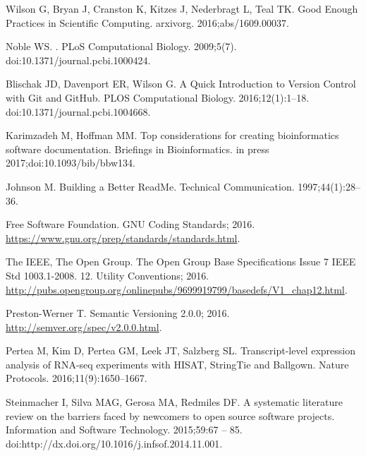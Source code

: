 \documentclass[10pt,letterpaper]{article}
\begin{document}
\begin{thebibliography}{10}
Wilson G, Bryan J, Cranston K, Kitzes J, Nederbragt L, Teal TK.
\newblock Good Enough Practices in Scientific Computing.
\newblock arxivorg. 2016;abs/1609.00037.

Noble WS.
.
\newblock PLoS Computational Biology. 2009;5(7).
\newblock doi:{10.1371/journal.pcbi.1000424}.

Blischak JD, Davenport ER, Wilson G.
\newblock A Quick Introduction to Version Control with Git and GitHub.
\newblock PLOS Computational Biology. 2016;12(1):1--18.
\newblock doi:{10.1371/journal.pcbi.1004668}.

Karimzadeh M, Hoffman MM.
\newblock Top considerations for creating bioinformatics software
  documentation.
\newblock Briefings in Bioinformatics. in press 2017;doi:{10.1093/bib/bbw134}.

Johnson M.
\newblock Building a Better ReadMe.
\newblock Technical Communication. 1997;44(1):28--36.

{\relax Free Software Foundation}. GNU Coding Standards; 2016.
\newblock \url{https://www.gnu.org/prep/standards/standards.html}.

{\relax The IEEE}, {\relax The Open Group}. The Open Group Base Specifications
  Issue 7 IEEE Std 1003.1-2008. 12. Utility Conventions; 2016.
\newblock
  \url{http://pubs.opengroup.org/onlinepubs/9699919799/basedefs/V1_chap12.html}.

Preston-Werner T. Semantic Versioning 2.0.0; 2016.
\newblock \url{http://semver.org/spec/v2.0.0.html}.

Pertea M, Kim D, Pertea GM, Leek JT, Salzberg SL.
\newblock Transcript-level expression analysis of RNA-seq experiments with
  HISAT, StringTie and Ballgown.
\newblock Nature Protocols. 2016;11(9):1650--1667.

Steinmacher I, Silva MAG, Gerosa MA, Redmiles DF.
\newblock A systematic literature review on the barriers faced by newcomers to
  open source software projects.
\newblock Information and Software Technology. 2015;59:67 -- 85.
\newblock doi:{http://dx.doi.org/10.1016/j.infsof.2014.11.001}.

\end{thebibliography}
\end{document}
